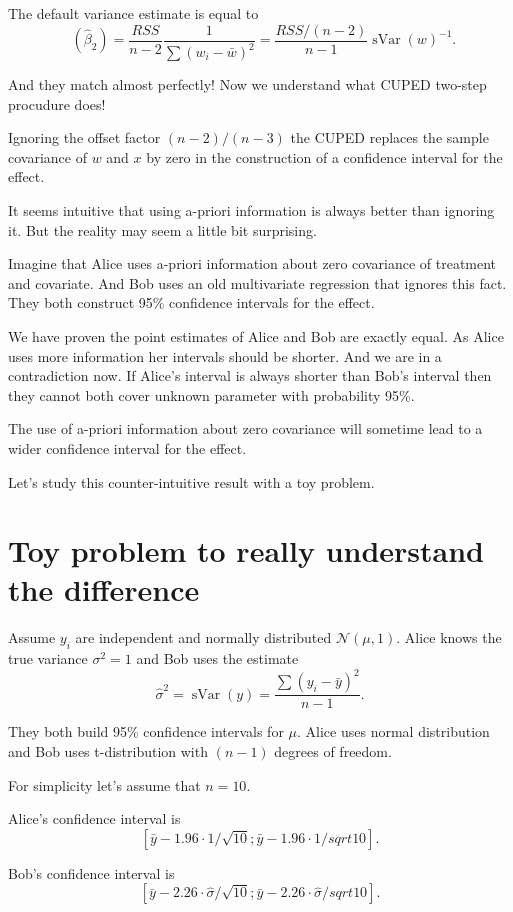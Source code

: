 \documentclass[10pt, a4paper]{article}
\DeclareMathOperator{\Var}{Var}
\DeclareMathOperator{\sVar}{sVar}
\DeclareMathOperator{\hVar}{\widehat{\Var}}
\newcommand{\cN}{\mathcal{N}}
\begin{document}
The default variance estimate is equal to
\[
    \hVar(\hat\beta_2) = \frac{RSS}{n-2} \frac{1}{\sum (w_i - \bar w)^2} = \frac{RSS/(n-2)}{n-1} \sVar(w)^{-1}.
\]

And they match almost perfectly! Now we understand what CUPED two-step procudure does!

Ignoring the offset factor $(n-2)/(n-3)$ the CUPED replaces the sample 
covariance of $w$ and $x$ by zero in the construction of a confidence interval for the effect. 

It seems intuitive that using a-priori information is always better than ignoring it. 
But the reality may seem a little bit surprising. 

Imagine that Alice uses a-priori information about zero covariance of treatment and covariate. 
And Bob uses an old multivariate regression that ignores this fact. 
They both construct 95\% confidence intervals for the effect. 

We have proven the point estimates of Alice and Bob are exactly equal. 
As Alice uses more information her intervals should be shorter. 
And we are in a contradiction now. 
If Alice's interval is always shorter than Bob's interval then they cannot 
both cover unknown parameter with probability 95\%.

The use of a-priori information about zero covariance will sometime lead to a wider 
confidence interval for the effect. 

Let's study this counter-intuitive result with a toy problem. 

\section{Toy problem to really understand the difference}

Assume $y_i$ are independent and normally distributed $\cN(\mu, 1)$.
Alice knows the true variance $\sigma^2 = 1$ and Bob uses the estimate 
\[
\hat\sigma^2 = \sVar(y) = \frac{\sum(y_i - \bar y)^2}{n-1}.    
\]

They both build 95\% confidence intervals for $\mu$. 
Alice uses normal distribution and Bob uses t-distribution with $(n-1)$ degrees of freedom. 

For simplicity let's assume that $n=10$. 

Alice's confidence interval is 
\[
[\bar y - 1.96 \cdot 1/\sqrt{10}; \bar y - 1.96 \cdot 1/sqrt{10}].
\]

Bob's confidence interval is 
\[
[\bar y - 2.26 \cdot \hat\sigma/\sqrt{10}; \bar y - 2.26 \cdot \hat\sigma/sqrt{10}].        
\]
\end{document}
